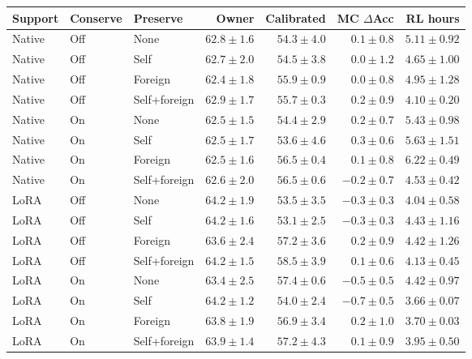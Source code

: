 \begin{tabular}{@{}lllrrrr@{}}
\toprule
Support & Conserve & Preserve & Owner & Calibrated & MC $\Delta$Acc & RL hours\\
\midrule
Native & Off & None & $62.8 \pm 1.6$ & $54.3 \pm 4.0$ & $0.1 \pm 0.8$ & $5.11 \pm 0.92$\\
Native & Off & Self & $62.7 \pm 2.0$ & $54.5 \pm 3.8$ & $0.0 \pm 1.2$ & $4.65 \pm 1.00$\\
Native & Off & Foreign & $62.4 \pm 1.8$ & $55.9 \pm 0.9$ & $0.0 \pm 0.8$ & $4.95 \pm 1.28$\\
Native & Off & Self+foreign & $62.9 \pm 1.7$ & $55.7 \pm 0.3$ & $0.2 \pm 0.9$ & $4.10 \pm 0.20$\\
Native & On & None & $62.5 \pm 1.5$ & $54.4 \pm 2.9$ & $0.2 \pm 0.7$ & $5.43 \pm 0.98$\\
Native & On & Self & $62.5 \pm 1.7$ & $53.6 \pm 4.6$ & $0.3 \pm 0.6$ & $5.63 \pm 1.51$\\
Native & On & Foreign & $62.5 \pm 1.6$ & $56.5 \pm 0.4$ & $0.1 \pm 0.8$ & $6.22 \pm 0.49$\\
Native & On & Self+foreign & $62.6 \pm 2.0$ & $56.5 \pm 0.6$ & $-0.2 \pm 0.7$ & $4.53 \pm 0.42$\\
LoRA & Off & None & $64.2 \pm 1.9$ & $53.5 \pm 3.5$ & $-0.3 \pm 0.3$ & $4.04 \pm 0.58$\\
LoRA & Off & Self & $64.2 \pm 1.6$ & $53.1 \pm 2.5$ & $-0.3 \pm 0.3$ & $4.43 \pm 1.16$\\
LoRA & Off & Foreign & $63.6 \pm 2.4$ & $57.2 \pm 3.6$ & $0.2 \pm 0.9$ & $4.42 \pm 1.26$\\
LoRA & Off & Self+foreign & $64.2 \pm 1.5$ & $58.5 \pm 3.9$ & $0.1 \pm 0.6$ & $4.13 \pm 0.45$\\
LoRA & On & None & $63.4 \pm 2.5$ & $57.4 \pm 0.6$ & $-0.5 \pm 0.5$ & $4.42 \pm 0.97$\\
LoRA & On & Self & $64.2 \pm 1.2$ & $54.0 \pm 2.4$ & $-0.7 \pm 0.5$ & $3.66 \pm 0.07$\\
LoRA & On & Foreign & $63.8 \pm 1.9$ & $56.9 \pm 3.4$ & $0.2 \pm 1.0$ & $3.70 \pm 0.03$\\
LoRA & On & Self+foreign & $63.9 \pm 1.4$ & $57.2 \pm 4.3$ & $0.1 \pm 0.9$ & $3.95 \pm 0.50$\\
\bottomrule
\end{tabular}
